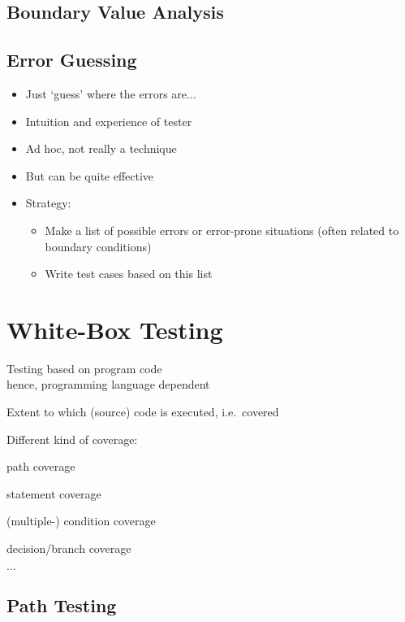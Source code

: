 			
\subsection{Boundary Value Analysis}
		
\subsection{Error Guessing}
			
\begin{itemize}
	\item Just ‘guess’ where the errors are$\ldots$
	\item Intuition and experience of tester
	\item Ad hoc, not really a technique
	\item But can be quite effective
	\item Strategy:
	\begin{itemize}
		\item Make a list of possible errors or error-prone situations (often related to boundary conditions)
		\item Write test cases based on this list
	\end{itemize}
\end{itemize}
			
\section{White-Box Testing}
		
\begin{itemize*}
	\item Testing based on program code\\
	hence, programming language dependent
	\item Extent to which (source) code is executed, i.e.\ covered
	\item Different kind of coverage:
	\begin{itemize*}
		\item path coverage
		\item statement coverage
		\item (multiple-) condition coverage
		\item decision/branch coverage
		\item $\ldots$
	\end{itemize*}
\end{itemize*}
			
\subsection{Path Testing}
				
